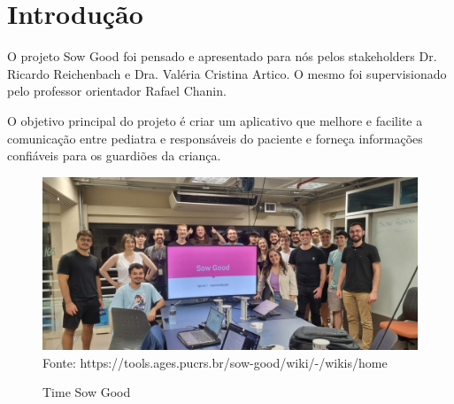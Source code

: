 \section[Introdução]{Introdução}

O projeto Sow Good foi pensado e apresentado para nós pelos stakeholders Dr. Ricardo Reichenbach e Dra. Valéria Cristina Artico. O mesmo foi supervisionado pelo professor orientador Rafael Chanin.

O objetivo principal do projeto é criar um aplicativo que melhore e facilite a comunicação entre pediatra e responsáveis do paciente e forneça informações confiáveis para os guardiões da criança.

\begin{figure}[H]
    \centering
    \small
    \caption{Time Sow Good}
    \includegraphics[width=1\linewidth]{conteudo//3 - ages II//conteudo//figures//foto-time.png}
    Fonte: https://tools.ages.pucrs.br/sow-good/wiki/-/wikis/home
\end{figure}